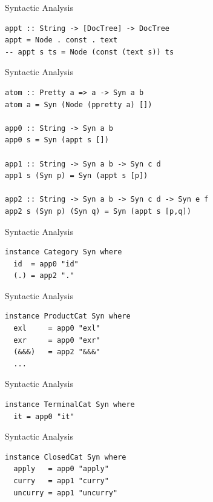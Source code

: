 \documentclass[10pt]{beamer}
\theoremstyle{definition}
\theoremstyle{remark}
\numberwithin{equation}{section}
\begin{document}
\begin{frame}[fragile]{Syntactic Analysis}
  \begin{lstlisting}
appt :: String -> [DocTree] -> DocTree
appt = Node . const . text
-- appt s ts = Node (const (text s)) ts
  \end{lstlisting}
\end{frame}

\begin{frame}[fragile]{Syntactic Analysis}
  \begin{lstlisting}
atom :: Pretty a => a -> Syn a b
atom a = Syn (Node (ppretty a) [])

app0 :: String -> Syn a b
app0 s = Syn (appt s [])

app1 :: String -> Syn a b -> Syn c d
app1 s (Syn p) = Syn (appt s [p])

app2 :: String -> Syn a b -> Syn c d -> Syn e f
app2 s (Syn p) (Syn q) = Syn (appt s [p,q])
  \end{lstlisting}
\end{frame}

\begin{frame}[fragile]{Syntactic Analysis}
  \begin{lstlisting}
instance Category Syn where
  id  = app0 "id"
  (.) = app2 "."
  \end{lstlisting}
\end{frame}

\begin{frame}[fragile]{Syntactic Analysis}
  \begin{lstlisting}
instance ProductCat Syn where
  exl     = app0 "exl"
  exr     = app0 "exr"
  (&&&)   = app2 "&&&"
  ...
  \end{lstlisting}
\end{frame}

\begin{frame}[fragile]{Syntactic Analysis}
  \begin{lstlisting}
instance TerminalCat Syn where
  it = app0 "it"
  \end{lstlisting}
\end{frame}

\begin{frame}[fragile]{Syntactic Analysis}
  \begin{lstlisting}
instance ClosedCat Syn where
  apply   = app0 "apply"
  curry   = app1 "curry"
  uncurry = app1 "uncurry"
  \end{lstlisting}
\end{frame}
\end{document}

